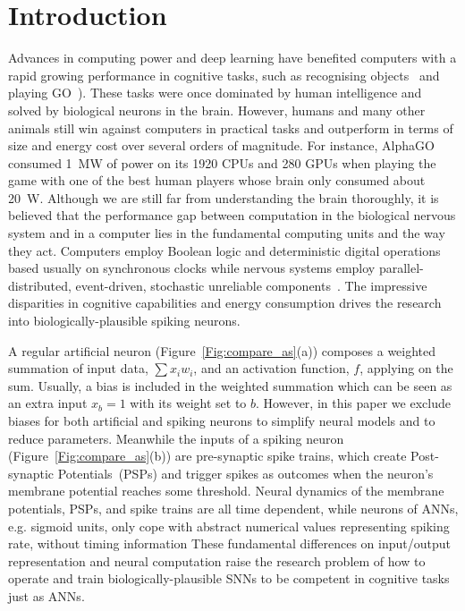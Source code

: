 \documentclass{article}
\begin{document}
\section{Introduction}
Advances in computing power and deep learning have benefited computers with a rapid growing performance in cognitive tasks, such as recognising objects~\cite{deng2009imagenet} and playing GO~\cite{silver2016mastering}). 
These tasks were once dominated by human intelligence and solved by biological neurons in the brain.
However, humans and many other animals still win against computers in practical tasks and outperform in terms of size and energy cost over several orders of magnitude.
For instance, AlphaGO~\cite{silver2016mastering} consumed 1~MW of power on its 1920 CPUs and 280 GPUs when playing the game with one of the best human players whose brain only consumed about 20~W.
Although we are still far from understanding the brain thoroughly, it is believed that the performance gap between computation in the biological nervous system and in a computer lies in the fundamental computing units and the way they act.
Computers employ Boolean logic and deterministic digital operations based usually on synchronous clocks while nervous systems employ parallel-distributed, event-driven, stochastic unreliable components~\cite{indiveri2009artificial}.
The impressive disparities in cognitive capabilities and energy consumption drives the research into biologically-plausible spiking neurons.

A regular artificial neuron (Figure~\ref{Fig:compare_as}(a)) composes a weighted summation of input data, $\sum x_i w_i$, and an activation function, $f$, applying on the sum.
Usually, a bias is included in the weighted summation which can be seen as an extra input $x_b = 1$ with its weight set to $b$.
However, in this paper we exclude biases for both artificial and spiking neurons to simplify neural models and to reduce parameters.
Meanwhile the inputs of a spiking neuron (Figure~\ref{Fig:compare_as}(b)) are pre-synaptic spike trains, which create Post-synaptic Potentials~(PSPs) and trigger spikes as outcomes when the neuron's membrane potential reaches some threshold.
Neural dynamics of the membrane potentials, PSPs, and spike trains are all time dependent, while neurons of ANNs, e.g. sigmoid units, only cope with abstract numerical values representing spiking rate, without timing information
These fundamental differences on input/output representation and neural computation raise the research problem of how to operate and train biologically-plausible SNNs to be competent in cognitive tasks just as ANNs.
\end{document}
